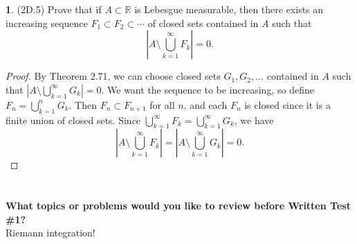 \documentclass[12pt]{article}
\theoremstyle{definition}
\newtheorem{ex}{}
\begin{document}
\begin{ex}
	(2D.5)
	Prove that if $A \subset \mathbb{R}$ is Lebesgue measurable, then there exists an increasing sequence $F_1 \subset F_2 \subset \cdots$ of closed sets contained in $A$ such that \begin{equation*}
		\left| A \setminus \bigcup_{k=1}^\infty F_k \right| = 0.
	\end{equation*}
\end{ex}
\begin{proof}
  By Theorem 2.71, we can choose closed sets $G_1, G_2, \dots$ contained in $A$ such that $\left| A \setminus \bigcup_{k=1}^\infty G_k \right| = 0$.
  We want the sequence to be increasing, so define $F_n = \bigcup_{k=1}^n G_k$.
  Then $F_n \subset F_{n+1}$ for all $n$, and each $F_n$ is closed since it is a finite union of closed sets.
  Since $\bigcup_{k=1}^\infty F_k = \bigcup_{k=1}^\infty G_k$, we have \begin{equation*}
    \left| A \setminus \bigcup_{k=1}^\infty F_k \right| = \left| A \setminus \bigcup_{k=1}^\infty G_k \right| = 0.
  \end{equation*}
\end{proof}

\section*{}

\textbf{What topics or problems would you like to review before Written Test \#1?}\\
Riemann integration!
\\\\
\end{document}
